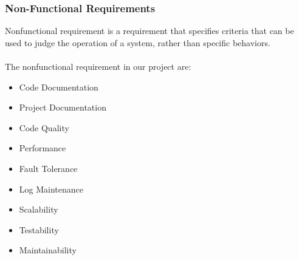 \newpage
\subsubsection{Non-Functional Requirements}
Non­functional requirement is a requirement that specifies criteria that can be used to judge the 
operation of a system, rather than specific behaviors.\\ 
\\
The non­functional requirement in our project are: 
\begin{itemize}
        \item Code Documentation
        \item Project Documentation
        \item Code Quality
        \item Performance
        \item Fault Tolerance
        \item Log Maintenance
        \item Scalability
        \item Testability
        \item Maintainability
        \end{itemize}
                
